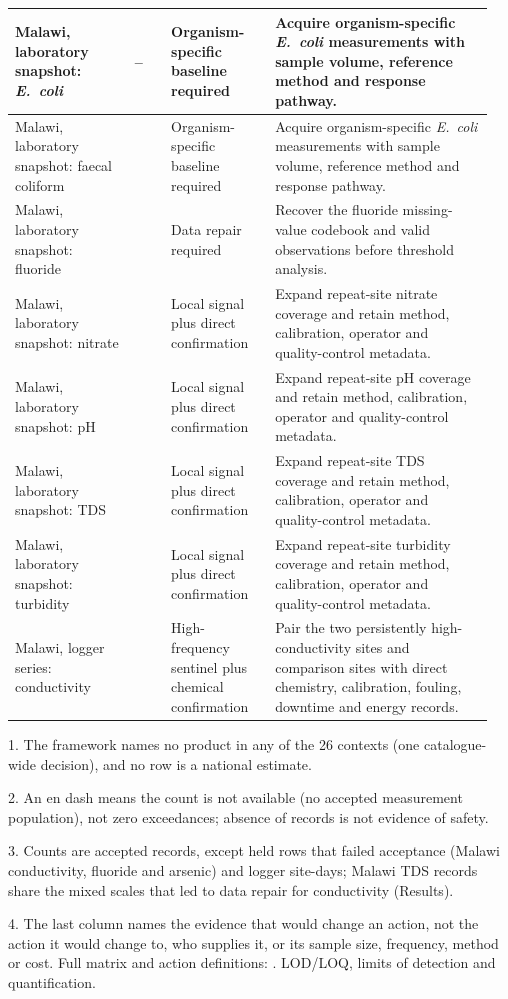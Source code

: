 \documentclass[10pt,letterpaper]{article}
\begin{document}
{\begin{longtable}{>{\raggedright\arraybackslash}p{0.2385\linewidth}>{\raggedleft\arraybackslash}p{0.0769\linewidth}>{\raggedright\arraybackslash}p{0.2077\linewidth}>{\raggedright\arraybackslash}p{0.4262\linewidth}}
Malawi, laboratory snapshot: \textit{E.~coli} & -- & Organism-specific baseline required & Acquire organism-specific \textit{E.~coli} measurements with sample volume, reference method and response pathway. \\ \hline
Malawi, laboratory snapshot: faecal coliform & 19 & Organism-specific baseline required & Acquire organism-specific \textit{E.~coli} measurements with sample volume, reference method and response pathway. \\ \hline
Malawi, laboratory snapshot: fluoride & 2 & Data repair required & Recover the fluoride missing-value codebook and valid observations before threshold analysis. \\ \hline
Malawi, laboratory snapshot: nitrate & 31 & Local signal plus direct confirmation & Expand repeat-site nitrate coverage and retain method, calibration, operator and quality-control metadata. \\ \hline
Malawi, laboratory snapshot: pH & 31 & Local signal plus direct confirmation & Expand repeat-site pH coverage and retain method, calibration, operator and quality-control metadata. \\ \hline
Malawi, laboratory snapshot: TDS & 31 & Local signal plus direct confirmation & Expand repeat-site TDS coverage and retain method, calibration, operator and quality-control metadata. \\ \hline
Malawi, laboratory snapshot: turbidity & 22 & Local signal plus direct confirmation & Expand repeat-site turbidity coverage and retain method, calibration, operator and quality-control metadata. \\ \hline
Malawi, logger series: conductivity & 714 & High-frequency sentinel plus chemical confirmation & Pair the two persistently high-conductivity sites and comparison sites with direct chemistry, calibration, fouling, downtime and energy records. \\ \hline
\end{longtable}
\begin{flushleft}
1. The framework names no product in any of the 26 contexts (one catalogue-wide decision), and no row is a national estimate.

2. An en dash means the count is not available (no accepted measurement population), not zero exceedances; absence of records is not evidence of safety.

3. Counts are accepted records, except held rows that failed acceptance (Malawi conductivity, fluoride and arsenic) and logger site-days; Malawi TDS records share the mixed scales that led to data repair for conductivity (Results).

4. The last column names the evidence that would change an action, not the action it would change to, who supplies it, or its sample size, frequency, method or cost. Full matrix and action definitions: . LOD/LOQ, limits of detection and quantification.
\end{flushleft}
}
\end{document}
